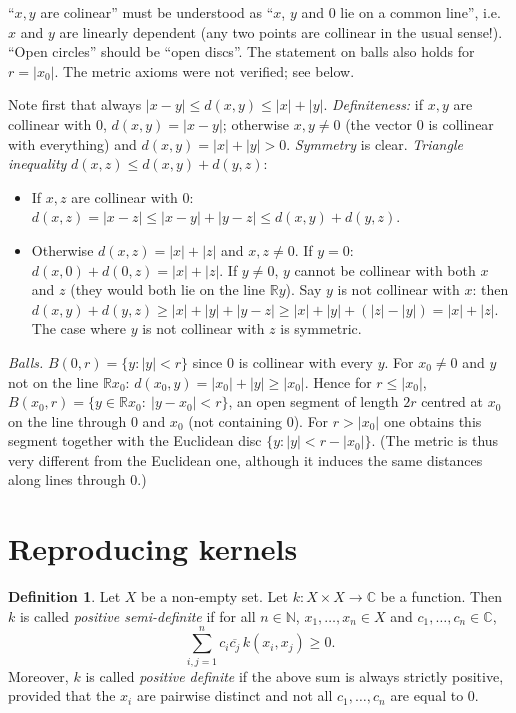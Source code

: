 \documentclass[11pt,a4paper]{article}
\numberwithin{equation}{section}
\newcommand{\N}{\mathbb{N}}
\newcommand{\R}{\mathbb{R}}
\newcommand{\C}{\mathbb{C}}
\newcommand{\conj}[1]{\overline{#1}}
\theoremstyle{plain}
\theoremstyle{definition}
\newtheorem{definition}[theorem]{Definition}
\theoremstyle{plain}
\theoremstyle{definition}
\begin{document}
\begin{correction}[(Ex.~7.5)]
``$x,y$ are colinear'' must be understood as ``$x$, $y$ and $0$ lie on a common line'', i.e.\
$x$ and $y$ are linearly dependent (any two points are collinear in the usual sense!).
``Open circles'' should be ``open discs''. The statement on balls also holds for
$r=|x_0|$. The metric axioms were not verified; see below.
\end{correction}

\begin{addition}
Note first that always $|x-y|\le d(x,y)\le|x|+|y|$.
\emph{Definiteness:} if $x,y$ are collinear with $0$, $d(x,y)=|x-y|$; otherwise $x,y\ne0$
(the vector $0$ is collinear with everything) and $d(x,y)=|x|+|y|>0$.
\emph{Symmetry} is clear.
\emph{Triangle inequality} $d(x,z)\le d(x,y)+d(y,z)$:
\begin{itemize}
\item If $x,z$ are collinear with $0$: $d(x,z)=|x-z|\le|x-y|+|y-z|\le d(x,y)+d(y,z)$.
\item Otherwise $d(x,z)=|x|+|z|$ and $x,z\ne0$. If $y=0$:
$d(x,0)+d(0,z)=|x|+|z|$. If $y\ne0$, $y$ cannot be collinear with both $x$ and $z$ (they
would both lie on the line $\R y$). Say $y$ is not collinear with $x$: then
$d(x,y)+d(y,z)\ge|x|+|y|+|y-z|\ge|x|+|y|+(|z|-|y|)=|x|+|z|$. The case where $y$ is not
collinear with $z$ is symmetric.
\end{itemize}
\emph{Balls.} $B(0,r)=\{y:|y|<r\}$ since $0$ is collinear with every $y$. For $x_0\ne0$
and $y$ not on the line $\R x_0$: $d(x_0,y)=|x_0|+|y|\ge|x_0|$. Hence for $r\le|x_0|$,
$B(x_0,r)=\{y\in\R x_0:\ |y-x_0|<r\}$, an open segment of length $2r$ centred at $x_0$
on the line through $0$ and $x_0$ (not containing $0$). For $r>|x_0|$ one obtains this
segment together with the Euclidean disc $\{y:|y|<r-|x_0|\}$.
(The metric is thus very different from the Euclidean one, although it induces the
same distances along lines through $0$.)
\end{addition}

\section{Reproducing kernels}

\begin{definition}\label{def:psdkernel}
Let $X$ be a non-empty set. Let $k:X\times X\to\C$ be a function. Then $k$ is called
\emph{positive semi-definite} if for all $n\in\N$, $x_1,\dots,x_n\in X$ and
$c_1,\dots,c_n\in\C$,
\[
\sum_{i,j=1}^nc_i\conj{c_j}\,k(x_i,x_j)\ge0 .
\]
Moreover, $k$ is called \emph{positive definite} if the above sum is always strictly
positive, provided that the $x_i$ are pairwise distinct and not all $c_1,\dots,c_n$ are
equal to $0$.
\end{definition}
\end{document}
